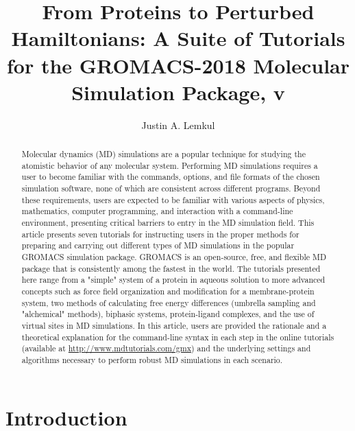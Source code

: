 \documentclass[9pt,tutorial]{livecoms}
\title{From Proteins to Perturbed Hamiltonians: A Suite of Tutorials for the GROMACS-2018 Molecular Simulation Package, v\versionnumber}
\author[1*]{Justin A. Lemkul}
\affil[1]{Department of Biochemistry, Virginia Tech, Blacksburg, VA, United States of America}
\newcommand{\urlstring}{http://www.mdtutorials.com/gmx}
\newcommand{\tutorialhomeurl}{\url{\urlstring}}
\begin{document}
\begin{frontmatter}
\maketitle

\begin{abstract}

Molecular dynamics (MD) simulations are a popular technique for studying the atomistic behavior of any molecular system. Performing MD simulations requires a user to become familiar with the commands, options, and file formats of the chosen simulation software, none of which are consistent across different programs. Beyond these requirements, users are expected to be familiar with various aspects of physics, mathematics, computer programming, and interaction with a command-line environment, presenting critical barriers to entry in the MD simulation field. This article presents seven tutorials for instructing users in the proper methods for preparing and carrying out different types of MD simulations in the popular GROMACS simulation package. GROMACS is an open-source, free, and flexible MD package that is consistently among the fastest in the world. The tutorials presented here range from a "simple" system of a protein in aqueous solution to more advanced concepts such as force field organization and modification for a membrane-protein system, two methods of calculating free energy differences (umbrella sampling and "alchemical" methods), biphasic systems, protein-ligand complexes, and the use of virtual sites in MD simulations. In this article, users are provided the rationale and a theoretical explanation for the command-line syntax in each step in the online tutorials (available at \tutorialhomeurl) and the underlying settings and algorithms necessary to perform robust MD simulations in each scenario.

\end{abstract}

\end{frontmatter}


\section{Introduction}
\end{document}

